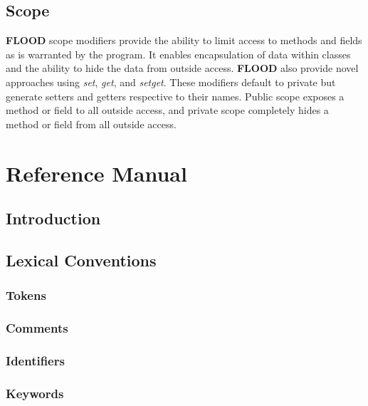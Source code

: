 \documentclass[12pt]{report}
\begin{document}
\section{Scope}

\begin{doublespace}
\textbf{FLOOD} scope modifiers provide the ability to limit access to methods and fields as is warranted by the program. It enables encapsulation of data within classes and the ability to hide the data from outside access. \textbf{FLOOD} also provide novel approaches using \textit{set}, \textit{get}, and \textit{setget}. These modifiers default to private but generate setters and getters respective to their names.  Public scope exposes a method or field to all outside access, and private scope completely hides a method or field from all outside access.
\end{doublespace}

\chapter{Reference Manual}

\section{Introduction}

\begin{doublespace}
\end{doublespace}

\section{Lexical Conventions}

\subsection{Tokens}

\subsection{Comments}

\subsection{Identifiers}

\subsection{Keywords}
\end{document}
